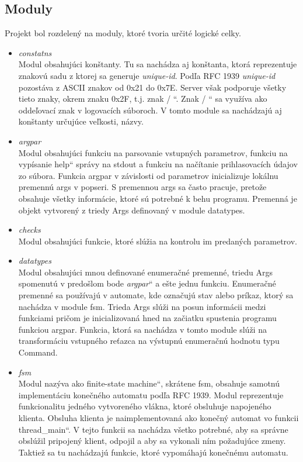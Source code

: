 \documentclass[11pt,a4paper]{article}
\providecommand{\uv}[1]{\quotedblbase #1\textquotedblleft}
\begin{document}
	\subsection{Moduly}
		
		\indent Projekt bol rozdelený na moduly, ktoré tvoria určité logické celky.

		\begin{itemize}

			\item \textit{constatns}\\[0.4em]
				\label{fig:uid}
				Modul obsahujúci konštanty. Tu sa nachádza aj konštanta, ktorá reprezentuje znakovú sadu z ktorej sa generuje \textit{unique-id}. Podľa RFC 1939 \textit{unique-id} pozostáva z ASCII znakov od 0x21 do 0x7E. Server však podporuje všetky tieto znaky, okrem znaku 0x2F, t.j. znak \uv{ / }. Znak \uv{ / } sa využíva ako oddeľovací znak v logovacích súboroch. V tomto module sa nachádzajú aj konštanty určujúce veľkosti, názvy.

			\item \textit{argpar}\\[0.4em]
				Modul obsahujúci funkciu na parsovanie vstupných parametrov, funkciu na vypísanie \uv{help} správy na stdout a funkciu na načítanie prihlasovacích údajov zo súbora. Funkcia argpar v závislosti od parametrov inicializuje lokálnu premennú args v popseri. S premennou args sa často pracuje, pretože obsahuje všetky informácie, ktoré sú potrebné k behu programu. Premenná je objekt vytvorený z triedy Args definovaný v module datatypes.

			\item \textit{checks}\\[0.4em]
				Modul obsahujúci funkcie, ktoré slúžia na kontrolu im predaných parametrov.

			\item \textit{datatypes}\\[0.4em]
				Modul obsahujúci mnou definované enumeračné premenné, triedu Args spomenutú v predošlom bode \uv{\textit{argpar}} a ešte jednu funkciu. Enumeračné premenné sa používajú v automate, kde označujú stav alebo príkaz, ktorý sa nachádza v module fsm. Trieda Args slúži na posun informácii medzi funkciami pričom je inicializovaná hned na začiatku spustenia programu funkciou argpar. Funkcia, ktorá sa nachádza v tomto module slúži na transformáciu vstupného reťazca na výstupnú enumeračnú hodnotu typu Command.

			\item \textit{fsm}\\[0.4em]
				Modul nazýva ako \uv{finite-state machine}, skrátene fsm, obsahuje samotnú implementáciu konečného automatu podľa RFC 1939. Modul reprezentuje funkcionalitu jedného vytvoreného vlákna, ktoré obsluhuje napojeného klienta. Obsluha klienta je naimplementovaná ako konečný automat vo funkcii \uv{thread\_main}. V tejto funkcii sa nachádza všetko potrebné, aby sa správne obslúžil pripojený klient, odpojil a aby sa vykonali ním požadujúce zmeny. Taktiež sa tu nachádzajú funkcie, ktoré vypomáhajú konečnému automatu.


\end{itemize}
\end{document}

